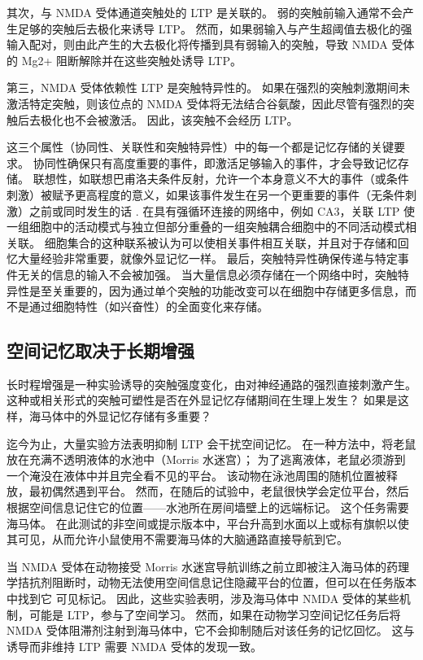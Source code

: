 其次，与 NMDA 受体通道突触处的 LTP 是关联的。 弱的突触前输入通常不会产生足够的突触后去极化来诱导 LTP。 然而，如果弱输入与产生超阈值去极化的强输入配对，则由此产生的大去极化将传播到具有弱输入的突触，导致 NMDA 受体的 Mg2+ 阻断解除并在这些突触处诱导 LTP。

第三，NMDA 受体依赖性 LTP 是突触特异性的。 如果在强烈的突触刺激期间未激活特定突触，则该位点的 NMDA 受体将无法结合谷氨酸，因此尽管有强烈的突触后去极化也不会被激活。 因此，该突触不会经历 LTP。

这三个属性（协同性、关联性和突触特异性）中的每一个都是记忆存储的关键要求。 协同性确保只有高度重要的事件，即激活足够输入的事件，才会导致记忆存储。 联想性，如联想巴甫洛夫条件反射，允许一个本身意义不大的事件（或条件刺激）被赋予更高程度的意义，如果该事件发生在另一个更重要的事件（无条件刺激）之前或同时发生的话 . 在具有强循环连接的网络中，例如 CA3，关联 LTP 使一组细胞中的活动模式与独立但部分重叠的一组突触耦合细胞中的不同活动模式相关联。 细胞集合的这种联系被认为可以使相关事件相互关联，并且对于存储和回忆大量经验非常重要，就像外显记忆一样。 最后，突触特异性确保传递与特定事件无关的信息的输入不会被加强。 当大量信息必须存储在一个网络中时，突触特异性是至关重要的，因为通过单个突触的功能改变可以在细胞中存储更多信息，而不是通过细胞特性（如兴奋性）的全面变化来存储。

\subsection{空间记忆取决于长期增强}

长时程增强是一种实验诱导的突触强度变化，由对神经通路的强烈直接刺激产生。 这种或相关形式的突触可塑性是否在外显记忆存储期间在生理上发生？ 如果是这样，海马体中的外显记忆存储有多重要？

迄今为止，大量实验方法表明抑制 LTP 会干扰空间记忆。 在一种方法中，将老鼠放在充满不透明液体的水池中（Morris 水迷宫）； 为了逃离液体，老鼠必须游到一个淹没在液体中并且完全看不见的平台。 该动物在泳池周围的随机位置被释放，最初偶然遇到平台。 然而，在随后的试验中，老鼠很快学会定位平台，然后根据空间信息记住它的位置——水池所在房间墙壁上的远端标记。 这个任务需要海马体。 在此测试的非空间或提示版本中，平台升高到水面以上或标有旗帜以使其可见，从而允许小鼠使用不需要海马体的大脑通路直接导航到它。

当 NMDA 受体在动物接受 Morris 水迷宫导航训练之前立即被注入海马体的药理学拮抗剂阻断时，动物无法使用空间信息记住隐藏平台的位置，但可以在任务版本中找到它 可见标记。 因此，这些实验表明，涉及海马体中 NMDA 受体的某些机制，可能是 LTP，参与了空间学习。 然而，如果在动物学习空间记忆任务后将 NMDA 受体阻滞剂注射到海马体中，它不会抑制随后对该任务的记忆回忆。 这与诱导而非维持 LTP 需要 NMDA 受体的发现一致。

